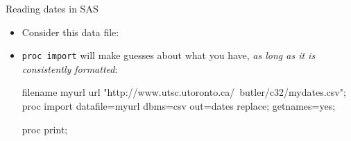 \documentclass[unknownkeysallowed]{beamer}\usepackage[]{graphicx}\usepackage[]{color}
\begin{document}

\begin{frame}[fragile]{Reading dates in SAS}
  
  \begin{itemize}
    \item Consider this data file:
      
      
    
  \item \texttt{proc import} will make guesses about what you have,
    \emph{as long as it is consistently formatted}:
    
  \begin{Datastep}
filename myurl url 
  "http://www.utsc.utoronto.ca/~butler/c32/mydates.csv";
proc import
  datafile=myurl
    dbms=csv
    out=dates
    replace;
  getnames=yes;
  \end{Datastep}

  \begin{Sascode}[store=da]
proc print;
  \end{Sascode}
    
  \end{itemize}
  
\end{frame}
\end{document}
